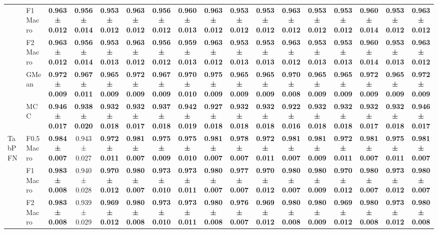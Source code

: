\begin{table}[H]
{\begin{tabular}{llccccccccccccccc}
 & F1 Macro & \textbf{0.963 ± 0.012} & \textbf{0.956 ± 0.014} & \textbf{0.953 ± 0.012} & \textbf{0.963 ± 0.012} & \textbf{0.956 ± 0.012} & \textbf{0.960 ± 0.013} & \textbf{0.963 ± 0.012} & \textbf{0.953 ± 0.012} & \textbf{0.953 ± 0.012} & \textbf{0.963 ± 0.012} & \textbf{0.953 ± 0.012} & \textbf{0.953 ± 0.012} & \textbf{0.960 ± 0.014} & \textbf{0.953 ± 0.012} & \textbf{0.963 ± 0.012} \\
 & F2 Macro & \textbf{0.963 ± 0.012} & \textbf{0.956 ± 0.014} & \textbf{0.953 ± 0.013} & \textbf{0.963 ± 0.012} & \textbf{0.956 ± 0.012} & \textbf{0.959 ± 0.013} & \textbf{0.963 ± 0.012} & \textbf{0.953 ± 0.013} & \textbf{0.953 ± 0.013} & \textbf{0.963 ± 0.012} & \textbf{0.953 ± 0.013} & \textbf{0.953 ± 0.013} & \textbf{0.960 ± 0.014} & \textbf{0.953 ± 0.013} & \textbf{0.963 ± 0.012} \\
 & GMean & \textbf{0.972 ± 0.009} & \textbf{0.967 ± 0.011} & \textbf{0.965 ± 0.009} & \textbf{0.972 ± 0.009} & \textbf{0.967 ± 0.009} & \textbf{0.970 ± 0.010} & \textbf{0.975 ± 0.009} & \textbf{0.965 ± 0.009} & \textbf{0.965 ± 0.009} & \textbf{0.970 ± 0.008} & \textbf{0.965 ± 0.009} & \textbf{0.965 ± 0.009} & \textbf{0.972 ± 0.009} & \textbf{0.965 ± 0.009} & \textbf{0.972 ± 0.009} \\
 & MCC & \textbf{0.946 ± 0.017} & \textbf{0.938 ± 0.020} & \textbf{0.932 ± 0.018} & \textbf{0.932 ± 0.017} & \textbf{0.937 ± 0.018} & \textbf{0.942 ± 0.019} & \textbf{0.927 ± 0.018} & \textbf{0.932 ± 0.018} & \textbf{0.932 ± 0.018} & \textbf{0.922 ± 0.016} & \textbf{0.932 ± 0.018} & \textbf{0.932 ± 0.018} & \textbf{0.932 ± 0.017} & \textbf{0.932 ± 0.018} & \textbf{0.946 ± 0.017} \\
\cline{1-17}
\multirow[t]{5}{*}{TabPFN} & F0.5 Macro & \textbf{0.984 ± 0.007} & 0.943 ± 0.027 & \textbf{0.972 ± 0.011} & \textbf{0.981 ± 0.007} & \textbf{0.975 ± 0.009} & \textbf{0.975 ± 0.010} & \textbf{0.981 ± 0.007} & \textbf{0.978 ± 0.007} & \textbf{0.972 ± 0.011} & \textbf{0.981 ± 0.007} & \textbf{0.981 ± 0.009} & \textbf{0.972 ± 0.011} & \textbf{0.981 ± 0.007} & \textbf{0.975 ± 0.011} & \textbf{0.981 ± 0.007} \\
 & F1 Macro & \textbf{0.983 ± 0.008} & 0.940 ± 0.028 & \textbf{0.970 ± 0.012} & \textbf{0.980 ± 0.007} & \textbf{0.973 ± 0.010} & \textbf{0.973 ± 0.011} & \textbf{0.980 ± 0.007} & \textbf{0.977 ± 0.007} & \textbf{0.970 ± 0.012} & \textbf{0.980 ± 0.007} & \textbf{0.980 ± 0.009} & \textbf{0.970 ± 0.012} & \textbf{0.980 ± 0.007} & \textbf{0.973 ± 0.012} & \textbf{0.980 ± 0.007} \\
 & F2 Macro & \textbf{0.983 ± 0.008} & 0.939 ± 0.029 & \textbf{0.969 ± 0.012} & \textbf{0.980 ± 0.008} & \textbf{0.973 ± 0.010} & \textbf{0.973 ± 0.011} & \textbf{0.980 ± 0.008} & \textbf{0.976 ± 0.007} & \textbf{0.969 ± 0.012} & \textbf{0.980 ± 0.008} & \textbf{0.980 ± 0.009} & \textbf{0.969 ± 0.012} & \textbf{0.980 ± 0.008} & \textbf{0.973 ± 0.012} & \textbf{0.980 ± 0.008} \\

\end{tabular}}
\end{table}

